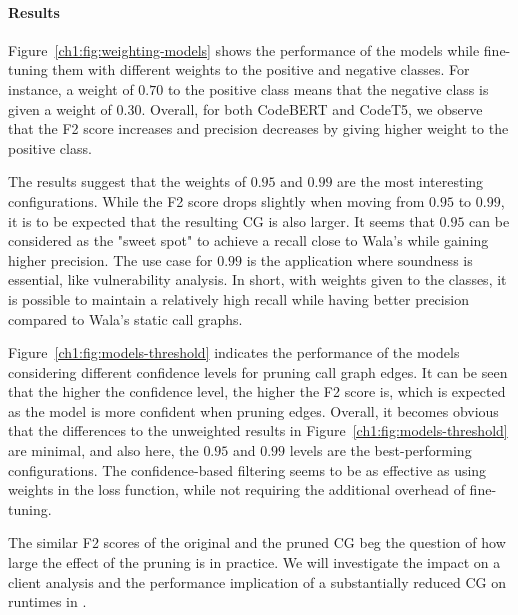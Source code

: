 \paragraph{Results} 
Figure~\ref{ch1:fig:weighting-models} shows the performance of the models while fine-tuning them with different weights to the positive and negative classes. For instance, a weight of $0.70$ to the positive class means that the negative class is given a weight of $0.30$. Overall, for both CodeBERT and CodeT5, we observe that the F2 score increases and precision decreases by giving higher weight to the positive class.

The results suggest that the weights of $0.95$ and $0.99$ are the most interesting configurations.
While the F2 score drops slightly when moving from $0.95$ to $0.99$, it is to be expected that the resulting CG is also larger.
It seems that $0.95$ can be considered as the "sweet spot" to achieve a recall close to Wala's while gaining higher precision. The use case for $0.99$ is the application where soundness is essential, like vulnerability analysis.
In short, with weights given to the classes, it is possible to maintain a relatively high recall while having better precision compared to Wala's static call graphs. 

Figure~\ref{ch1:fig:models-threshold} indicates the performance of the models considering different confidence levels for pruning call graph edges.
It can be seen that the higher the confidence level, the higher the F2 score is, which is expected as the model is more confident when pruning edges.
Overall, it becomes obvious that the differences to the unweighted results in Figure~\ref{ch1:fig:models-threshold} are minimal, and also here, the $0.95$ and $0.99$ levels are the best-performing configurations.
The confidence-based filtering seems to be as effective as using weights in the loss function, while not requiring the additional overhead of fine-tuning.

The similar F2 scores of the original and the pruned CG beg the question of how large the effect of the pruning is in practice.
We will investigate the impact on a client analysis and the performance implication of a substantially reduced CG on runtimes in .

